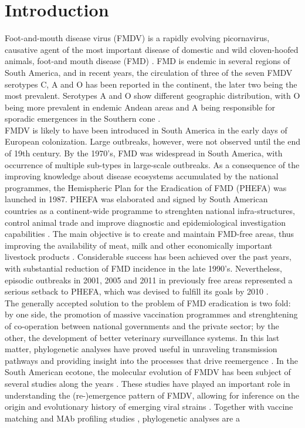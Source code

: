 \documentclass[10pt]{article}
\begin{document}
\section*{Introduction}
\indent Foot-and-mouth disease virus (FMDV) is a rapidly evolving picornavirus, causative agent of the most important disease of domestic and wild cloven-hoofed animals, foot-and mouth disease (FMD) \cite{review}. FMD is endemic in several regions of South America, and in recent years, the circulation of three of the seven FMDV serotypes C, A and O has been reported in the continent, the later two being the most prevalent. Serotypes A and O show different  geographic distribution, with O being more prevalent in endemic Andean areas \cite{andean} and A being responsible for sporadic emergences in the Southern cone \cite{Perez2001,Malirat2012
}.\\
\indent FMDV is likely to have been introduced in South America in the early days of European colonization. Large outbreaks, however, were not observed until the end of 19th century. By the 1970's, FMD was widespread in South America, with occurrence of multiple sub-types \cite{Saraiva2003} in large-scale outbreaks. As a consequence of the improving knowledge about disease ecosystems accumulated by the national programmes, the Hemispheric Plan for the Eradication of FMD (PHEFA) was launched in 1987. PHEFA was elaborated and signed by South American countries as a continent-wide programme to strenghten national infra-structures, control animal trade and improve diagnostic and epidemiological investigation capabilities \cite{review_eradication}. The main objective is to create and maintain FMD-free areas, thus improving the availability of meat, milk and other economically important livestock products \cite{Saraiva2003,Saraiva2004,review_eradication,combining}. Considerable success has been achieved over the 
past years, with substantial reduction of FMD incidence in the late 1990's. Nevertheless, episodic outbreaks in 2001, 2005 and 2011 in previously free areas represented a serious setback to PHEFA, which was devised to fulfill its goals by 2010 \cite{Saraiva2003,Saraiva2004}.\\
\indent The generally accepted solution to the problem of FMD eradication is two fold: by one side, the promotion of massive vaccination programmes \cite{vaccinationSA} and strenghtening of co-operation between national governments and the private sector; by the other, the development of better veterinary surveillance systems. In this last matter, phylogenetic analyses have proved useful in unraveling transmission pathways \cite{cottam2008} and providing insight into the processes that drive reemergence \cite{combining}. In the South American ecotone, the molecular evolution of FMDV has been subject of several studies along the years \cite{Perez2001,Malirat2007,andean,Malirat2011,Maradei2013}. These studies have played an important role in understanding the (re-)emergence pattern of FMDV, allowing for inference on the origin and evolutionary history of emerging viral strains \cite{topotypes,Perez2001}. Together with vaccine matching and MAb profiling studies \cite{Maradei2011}, phylogenetic analyses are a 
\end{document}
